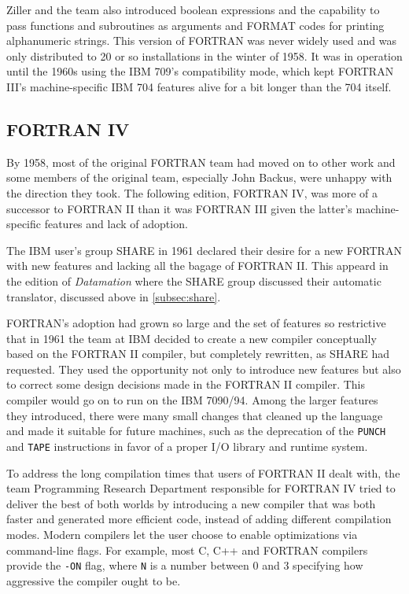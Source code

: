 Ziller and the team also introduced boolean expressions and the capability to
pass functions and subroutines as arguments and FORMAT codes for printing
alphanumeric strings.
This version of FORTRAN was never widely used and was only distributed to
20 or so installations in the winter of 1958.
It was in operation until the 1960s using the IBM 709's compatibility mode,
which kept FORTRAN III's machine-specific IBM 704 features alive for a bit longer
than the 704 itself.

\subsection{FORTRAN IV}

By 1958, most of the original FORTRAN team had moved on to other work and
some members of the original team, especially John Backus, were unhappy with
the direction they took.
The following edition, FORTRAN IV, was more of a successor to FORTRAN II than
it was FORTRAN III given the latter's machine-specific features and
lack of adoption.

The IBM user's group SHARE in 1961 declared their desire for a new FORTRAN with
new features and lacking all the bagage of FORTRAN II.
This appeard in the 
edition of \textit{Datamation} where the SHARE group discussed their automatic
translator, discussed above in \cref{subsec:share}.

FORTRAN's adoption had grown so large and the set of features so restrictive
that in 1961 the team at IBM decided to create a new compiler conceptually
based on the FORTRAN II compiler, but completely rewritten, as SHARE had requested.
They used the opportunity not only to introduce new features but also to
correct some design decisions made in the FORTRAN II compiler.
This compiler would go on to run on the IBM 7090/94.
Among the larger features they introduced, there were many small changes that
cleaned up the language and made it suitable for future machines,
such as the deprecation of the \texttt{PUNCH} and \texttt{TAPE}
instructions in favor of a proper I/O library and runtime system.

To address the long compilation times that users of FORTRAN II dealt with,
the team Programming Research Department responsible for FORTRAN IV
tried to deliver the best of both worlds by introducing a new compiler
that was both faster and generated more efficient code, instead of adding
different compilation modes. Modern compilers let the user choose to enable
optimizations via command-line flags. For example, most C, C++ and FORTRAN compilers
provide the \texttt{-ON} flag, where \texttt{N} is a number
between 0 and 3 specifying how aggressive the compiler ought to be.


